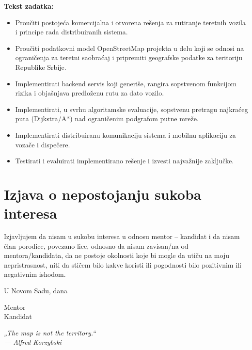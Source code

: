 \bigskip
\textbf{Tekst zadatka:}
\begin{itemize}
\item Proučiti postojeća komercijalna i otvorena rešenja za rutiranje teretnih vozila i principe rada distribuiranih sistema.
\item Proučiti podatkovni model OpenStreetMap projekta u delu koji se odnosi na ograničenja za teretni saobraćaj i pripremiti geografske podatke za teritoriju Republike Srbije.
\item Implementirati backend servis koji generiše, rangira sopstvenom funkcijom rizika i objašnjava predloženu rutu za dato vozilo.
\item Implementirati, u svrhu algoritamske evaluacije, sopstvenu pretragu najkraćeg puta (Dijkstra/A*) nad ograničenim podgrafom putne mreže.
\item Implementirati distribuiranu komunikaciju sistema i mobilnu aplikaciju za vozače i dispečere.
\item Testirati i evaluirati implementirano rešenje i izvesti najvažnije zaključke.
\end{itemize}

\chapter*{Izjava o nepostojanju sukoba interesa}
Izjavljujem da nisam u sukobu interesa u odnosu mentor -- kandidat i da nisam član porodice, povezano lice, odnosno da nisam zavisan/na od mentora/kandidata, da ne postoje okolnosti koje bi mogle da utiču na moju nepristrasnost, niti da stičem bilo kakve koristi ili pogodnosti bilo pozitivnim ili negativnim ishodom.

\bigskip
U Novom Sadu, dana \underline{\hspace{4cm}}

\bigskip
Mentor \dotfill\\[6pt]
Kandidat \dotfill

\clearpage
\thispagestyle{empty}
\vspace*{0.35\textheight}
\begin{center}
\itshape „The map is not the territory.“\\[4pt]
\upshape --- Alfred Korzybski
\end{center}
\clearpage
